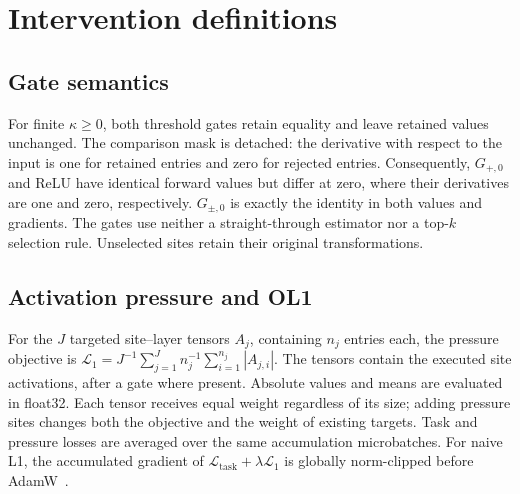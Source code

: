 \section{Intervention definitions}
\label{app:interventions}

\subsection{Gate semantics}

For finite $\kappa\geq0$, both threshold gates retain equality and leave retained values unchanged.
The comparison mask is detached: the derivative with respect to the input
is one for retained entries and zero for rejected entries. Consequently,
$G_{+,0}$ and ReLU have identical forward values but differ at zero, where
their derivatives are one and zero, respectively. $G_{\pm,0}$ is exactly the
identity in both values and gradients. The gates use neither a straight-through
estimator nor a top-$k$ selection rule. Unselected sites retain their original transformations.

\subsection{Activation pressure and OL1}
\label{app:pressure}

For the $J$ targeted site--layer tensors $A_j$, containing $n_j$ entries each,
the pressure objective is
$\mathcal{L}_1=J^{-1}\sum_{j=1}^{J}n_j^{-1}\sum_{i=1}^{n_j}|A_{j,i}|$.
The tensors contain the executed site activations, after a gate where present.
Absolute values and means are evaluated in float32.
Each tensor receives equal weight regardless of its size; adding pressure
sites changes both the objective and the weight of existing targets.
Task and pressure losses are averaged over the same accumulation microbatches.
For naive L1, the accumulated gradient of
$\mathcal{L}_{\mathrm{task}}+\lambda\mathcal{L}_1$ is globally norm-clipped
before AdamW~\citep{loshchilov2019adamw}.

